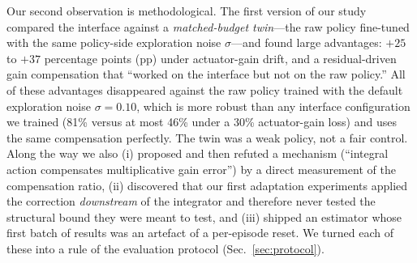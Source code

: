 \documentclass[conference]{IEEEtran}
\begin{document}
Our second observation is methodological. The first version of our study compared the interface against a \emph{matched-budget twin}---the raw policy fine-tuned with the same policy-side exploration noise $\sigma$---and found large advantages: $+25$ to $+37$ percentage points (pp) under actuator-gain drift, and a residual-driven gain compensation that ``worked on the interface but not on the raw policy.'' All of these advantages disappeared against the raw policy trained with the default exploration noise $\sigma=0.10$, which is more robust than any interface configuration we trained (81\% versus at most 46\% under a 30\% actuator-gain loss) and uses the same compensation perfectly. The twin was a weak policy, not a fair control. Along the way we also (i) proposed and then refuted a mechanism (``integral action compensates multiplicative gain error'') by a direct measurement of the compensation ratio, (ii) discovered that our first adaptation experiments applied the correction \emph{downstream} of the integrator and therefore never tested the structural bound they were meant to test, and (iii) shipped an estimator whose first batch of results was an artefact of a per-episode reset. We turned each of these into a rule of the evaluation protocol (Sec.~\ref{sec:protocol}).
\end{document}
